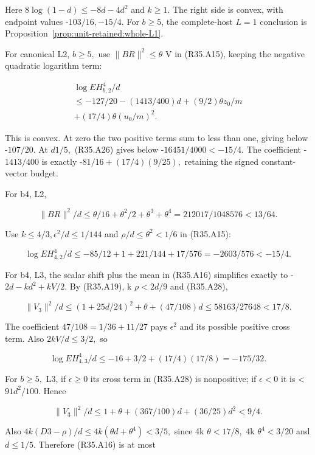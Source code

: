 Here \(8\log(1-d)\le -8d-4d^2\) and \(k\ge 1.\) The right side is convex, with endpoint values -\(103/16,\allowbreak -15/4.\) For $b\ge5$, the complete-host $L=1$ conclusion is Proposition~\ref{prop:unit-retained:whole-L1}.

For canonical L2, \(b\ge 5,\allowbreak \) use \(\lVert BR\rVert ^2\le \theta\) V in (R35.A15), keeping the negative quadratic logarithm term:

\[
\begin{gathered}
\log EH_{b,2}^4/d\\
\le-127/20-(1413/400)d+(9/2)\theta z_0/m\\
+(17/4)\theta(u_0/m)^2.
\end{gathered}\tag{R35.A31}
\]

This is convex. At zero the two positive terms sum to less than one, giving below -\(107/20.\) At \(d1/5,\allowbreak \) (R35.A26) gives below -\(16451/4000<-15/4.\) The coefficient -\(1413/400\) is exactly -\(81/16+(17/4)(9/25),\allowbreak \) retaining the signed constant-vector budget.

For b4, L2,

\[
\|BR\|^2/d\le\theta/16+\theta^2/2+\theta^3+\theta^4
=212017/1048576<13/64.
\]

Use \(k\le 4/3,\allowbreak  \epsilon^2/d\le 1/144\) and \(\rho/d\le \theta^2<1/6\) in (R35.A15):

\[
\log EH_{4,2}^4/d
\le-85/12+1+221/144+17/576=-2603/576<-15/4. \tag{R35.A32}
\]



For b4, L3, the scalar shift plus the mean in (R35.A16) simplifies exactly to
-\(2d-kd^2+kV/2.\) By (R35.A19), k \(\rho<2d/9\) and (R35.A28),

\[
\|V_3\|^2/d\le(1+25d/24)^2+\theta+(47/108)d
\le58163/27648<17/8.
\]

The coefficient \(47/108=1/36+11/27\) pays \(\epsilon^2\) and its possible positive cross term. Also \(2kV/d\le 3/2,\allowbreak \) so

\[
\log EH_{4,3}^4/d\le-16+3/2+(17/4)(17/8)=-175/32. \tag{R35.A33}
\]

For \(b\ge 5,\allowbreak \) L3, if \(\epsilon\ge 0\) its cross term in (R35.A28) is nonpositive; if \(\epsilon<0\) it is <\(91d^2/100.\) Hence

\[
\|V_3\|^2/d\le1+\theta+(367/100)d+(36/25)d^2<9/4.
\]

Also \(4k(D3-\rho)/d\le 4k(\theta d+\theta^4)<3/5,\allowbreak \) since
4k \(\theta<17/8,\allowbreak \) 4k \(\theta^4<3/20\) and \(d\le 1/5.\) Therefore (R35.A16) is at most

